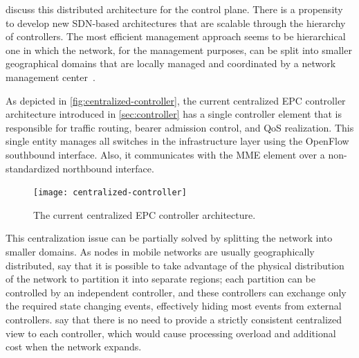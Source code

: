 \citet{Arslan2015} discuss this distributed architecture for the control plane.
There is a propensity to develop new \ac{SDN}-based architectures that are
scalable through the hierarchy of controllers. The most efficient management
approach seems to be hierarchical one in which the network, for the management
purposes, can be split into smaller geographical domains that are locally
managed and coordinated by a network management center~\cite{Kuklinski2014a}.

As depicted in \autoref{fig:centralized-controller}, the current centralized
\ac{EPC} controller architecture introduced in \autoref{sec:controller} has a
single controller element that is responsible for traffic routing, bearer
admission control, and \ac{QoS} realization. This single entity manages all
switches in the infrastructure layer using the OpenFlow southbound interface.
Also, it communicates with the \ac{MME} element over a non-standardized
northbound interface.
\begin{figure}[htb]
  \centering
  \texttt{[image: centralized-controller]}
  \caption{The current centralized \acs{EPC} controller architecture.}
  \label{fig:centralized-controller}
\end{figure}
This centralization issue can be partially solved by splitting the network into
smaller domains. As nodes in mobile networks are usually geographically
distributed, \citet{Yeganeh2013} say that it is possible to take advantage of
the physical distribution of the network to partition it into separate regions;
each partition can be controlled by an independent controller, and these
controllers can exchange only the required state changing events, effectively
hiding most events from external controllers. \citet{Yang2015a} say that there
is no need to provide a strictly consistent centralized view to each
controller, which would cause processing overload and additional cost when the
network expands.

